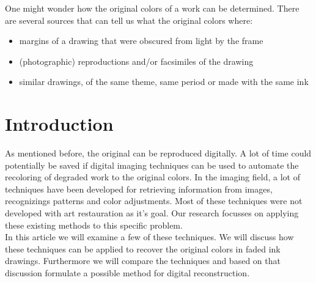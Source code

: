 	One might wonder how the original colors of a work can be determined.
	There are several sources that can tell us what the original colors where:

	\begin{itemize}
		\item margins of a drawing that were obscured from light by the frame
		\item (photographic) reproductions and/or facsimiles of the drawing
		\item similar drawings, of the same theme, same period
                  or made with the same ink %
	\end{itemize}

\section{Introduction}

	As mentioned before, the original can be reproduced digitally.
	A lot of time could potentially be saved if digital imaging techniques can be used to automate
	the recoloring of degraded work to the original colors.
	In the imaging field, a lot of techniques have been developed for retrieving information
	from images, recognizings patterns and color adjustments.
	Most of these techniques were not developed with art restauration as it's goal.
	Our research focusses on applying these existing methods to this specific problem. \\

	In this article we will examine a few of these techniques.
	We will discuss how these techniques can be applied to recover the original colors
	in faded ink drawings.
	Furthermore we will compare the techniques and based on that discussion formulate a possible
	method for digital reconstruction.
